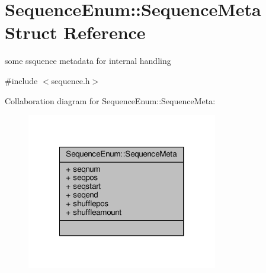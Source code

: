 \hypertarget{structSequenceEnum_1_1SequenceMeta}{\section{Sequence\-Enum\-:\-:Sequence\-Meta Struct Reference}
\label{structSequenceEnum_1_1SequenceMeta}
}


some ssquence metadata for internal handling  




{\ttfamily \#include $<$sequence.\-h$>$}



Collaboration diagram for Sequence\-Enum\-:\-:Sequence\-Meta\-:\nopagebreak
\begin{figure}[H]
\begin{center}
\leavevmode
\includegraphics[width=236pt]{structSequenceEnum_1_1SequenceMeta__coll__graph}
\end{center}
\end{figure}
